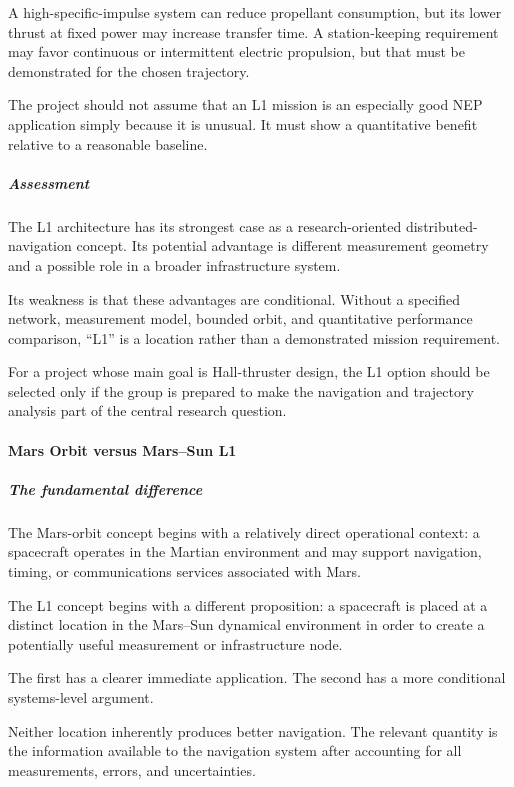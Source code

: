 A high-specific-impulse system can reduce propellant consumption,
but its lower thrust at fixed power may increase transfer time.
A station-keeping requirement may favor continuous or intermittent
electric propulsion, but that must be demonstrated for the
chosen trajectory.

The project should not assume that an L1 mission is an especially
good NEP application simply because it is unusual. It must
show a quantitative benefit relative to a reasonable baseline.

\subparagraph{Assessment}

The L1 architecture has its strongest case as a research-oriented
distributed-navigation concept. Its potential advantage is
different measurement geometry and a possible role in a broader
infrastructure system.

Its weakness is that these advantages are conditional. Without
a specified network, measurement model, bounded orbit, and
quantitative performance comparison, ``L1'' is a location rather
than a demonstrated mission requirement.

For a project whose main goal is Hall-thruster design, the L1
option should be selected only if the group is prepared to make
the navigation and trajectory analysis part of the central
research question.

\paragraph{Mars Orbit versus Mars--Sun L1}

\subparagraph{The fundamental difference}

The Mars-orbit concept begins with a relatively direct operational
context: a spacecraft operates in the Martian environment and
may support navigation, timing, or communications services
associated with Mars.

The L1 concept begins with a different proposition: a spacecraft
is placed at a distinct location in the Mars--Sun dynamical
environment in order to create a potentially useful measurement
or infrastructure node.

The first has a clearer immediate application. The second has
a more conditional systems-level argument.

Neither location inherently produces better navigation. The
relevant quantity is the information available to the navigation
system after accounting for all measurements, errors, and
uncertainties.

